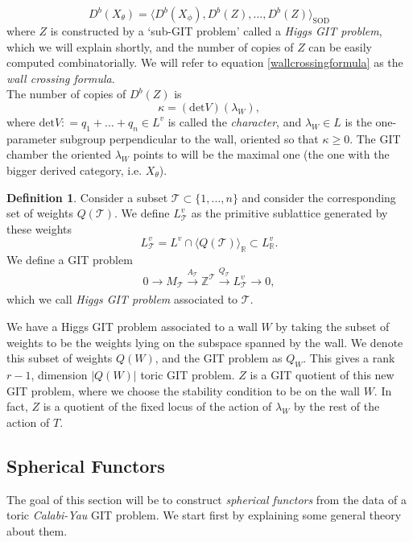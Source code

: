 \documentclass[oneside,reqno]{amsart}
\theoremstyle{definition}
\newtheorem{definition}{Definition}[section]
\theoremstyle{definition}
\theoremstyle{definition}
\theoremstyle{definition}
\newcommand{\defeq}{\mathrel{\mathop:}=}
\newcommand{\Z}{\mathbb{Z}}
\begin{document}
\begin{equation}
\label{wallcrossingformula}
D^b(X_{\theta}) = \langle D^b(X_{\phi}), D^b(Z),\dots, D^b(Z)\rangle_{\text{SOD}}
\end{equation}
where $Z$ is constructed by a `sub-GIT problem' called a \textit{Higgs GIT problem}, which we will explain shortly, and the number of copies of $Z$ can be easily computed combinatorially. We will refer to equation \eqref{wallcrossingformula} as the \textit{wall crossing formula}. \\
\newline
The number of copies of $D^b(Z)$ is 
\begin{equation}
    \label{wcmult}
    \kappa = (\text{det} V) (\lambda_W),
\end{equation}
where $\text{det} V\defeq q_1 + \dots +q_n \in L^v$ is called the \textit{character}, and $\lambda_W \in L$ is the one-parameter subgroup perpendicular to the wall, oriented so that $\kappa \geq 0$. The GIT chamber the oriented $\lambda_W$ points to will be the maximal one (the one with the bigger derived category, i.e. $X_{\theta}$). 
\begin{definition}
Consider a subset $\mathcal{T} \subset \{1,...,n \}$ and consider the corresponding set of weights $Q(\mathcal{T})$. We define $L_{\mathcal{T}}^v$ as the primitive sublattice generated by these weights
$$L_{\mathcal{T}}^v= L^v \cap \langle  Q(\mathcal{T}) \rangle_{\mathbb{R}} \subset L_{\mathbb{R}}^v.
$$
We define a GIT problem
$$
0 \xrightarrow[]{} M_{\mathcal{T}} \xrightarrow[]{A_{\mathcal{T}}} \Z^\mathcal{T} \xrightarrow[]{Q_{\mathcal{T}}} L^v_{\mathcal{T}} \xrightarrow[]{} 0,
$$
which we call \textit{Higgs GIT problem} associated to $\mathcal{T}$.
\end{definition}
We have a Higgs GIT problem associated to a wall $W$ by taking the subset of weights to be the weights lying on the subspace spanned by the wall. We denote this subset of weights $Q(W)$, and the GIT problem as $Q_W$. This gives a rank $r-1$, dimension $|Q(W)|$ toric GIT problem. $Z$ is a GIT quotient of this new GIT problem, where we choose the stability condition to be on the wall $W$. In fact, $Z$ is a quotient of the fixed locus of the action of $\lambda_W$ by the rest of the action of $T$.
\subsection{Spherical Functors}
\label{CY}

The goal of this section will be to construct \textit{spherical functors} from the data of a toric \textit{Calabi-Yau} GIT problem. We start first by explaining some general theory about them. 
\end{document}
